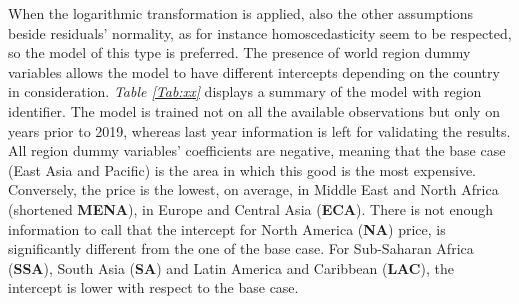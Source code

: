 \documentclass[a4paper,12pt]{book}
\begin{document}
When the logarithmic transformation is applied, also the other assumptions beside residuals' normality, as for instance homoscedasticity seem to be respected, so the model of this type is preferred. The presence of world region dummy variables allows the model to have different intercepts depending on the country in consideration. \textit{Table \ref{Tab:xx}} displays a summary of the model with region identifier. The model is trained not on all the available observations but only on years prior to 2019, whereas last year information is left for validating the results.\\

All region dummy variables' coefficients are negative, meaning that the base case (East Asia and Pacific) is the area in which this good is the most expensive. Conversely, the price is the lowest, on average, in Middle East and North Africa (shortened \textbf{MENA}), in Europe and Central Asia (\textbf{ECA}). There is not enough information to call that the intercept for North America (\textbf{NA}) price, is significantly different from the one of the base case. For Sub-Saharan Africa (\textbf{SSA}), South Asia (\textbf{SA}) and Latin America and Caribbean (\textbf{LAC}), the intercept is lower with respect to the base case.
\end{document}
